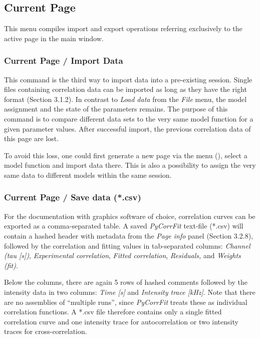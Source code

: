 \subsection{ Current Page}
\label{sec:cp}
This menu compiles import and export operations referring exclusively to the active page in the main window. 

\subsubsection{Current Page / Import Data}
\label{sec:cp.id}
This command is the third way to import data into a pre-existing session. Single files containing correlation data can be imported as long as they have the right format (Section 3.1.2). In contrast to \textit{Load data} from the \textit{File} menu, the model assignment and the state of the parameters remains. The purpose of this command is to compare different data sets to the very same model function for a given parameter values. After successful import, the previous correlation data of this page are lost.

To avoid this loss, one could first generate a new page via the menu (), select a model function and import data there. This is also a possibility to assign the very same data to different models within the same session.

\subsubsection{Current Page / Save data (*.csv)}
\label{sec:cp.sd}
For the documentation with graphics software of choice, correlation curves can be exported as a comma-separated table. A saved \textit{PyCorrFit} text-file (*.csv) will contain a hashed header with metadata from the \textit{Page info} panel (Section 3.2.8), followed by the correlation and fitting values in tab-separated columns: \textit{Channel (tau [s])}, \textit{Experimental correlation}, \textit{Fitted correlation}, \textit{Residuals, }and \textit{Weights (fit)}. 

Below the columns, there are again 5 rows of hashed comments followed by the intensity data in two columns: \textit{Time [s]} and \textit{Intensity trace [kHz]}. Note that there are no assemblies of “multiple runs”, since \textit{PyCorrFit} treats these as individual correlation functions. A *.csv file therefore contains only a single fitted correlation curve and one intensity trace for autocorrelation or two intensity traces for cross-correlation.

